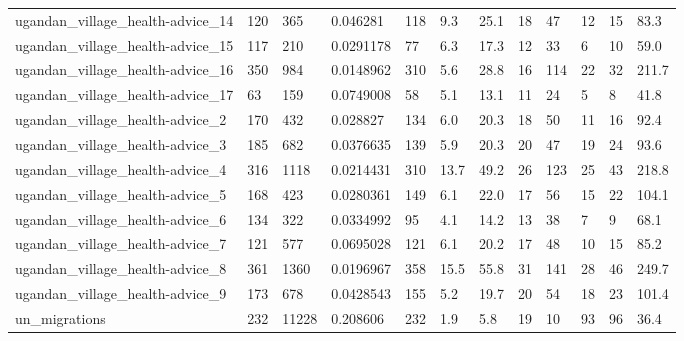\begin{longtable}{llllllllllll}
 ugandan\_village\_health-advice\_14                   & 120        & 365       & 0.046281    & 118   & 9.3    & 25.1   & 18    & 47     & 12     & 15     & 83.3    \\
 ugandan\_village\_health-advice\_15                   & 117        & 210       & 0.0291178   & 77    & 6.3    & 17.3   & 12    & 33     & 6      & 10     & 59.0    \\
 ugandan\_village\_health-advice\_16                   & 350        & 984       & 0.0148962   & 310   & 5.6    & 28.8   & 16    & 114    & 22     & 32     & 211.7   \\
 ugandan\_village\_health-advice\_17                   & 63         & 159       & 0.0749008   & 58    & 5.1    & 13.1   & 11    & 24     & 5      & 8      & 41.8    \\
 ugandan\_village\_health-advice\_2                    & 170        & 432       & 0.028827    & 134   & 6.0    & 20.3   & 18    & 50     & 11     & 16     & 92.4    \\
 ugandan\_village\_health-advice\_3                    & 185        & 682       & 0.0376635   & 139   & 5.9    & 20.3   & 20    & 47     & 19     & 24     & 93.6    \\
 ugandan\_village\_health-advice\_4                    & 316        & 1118      & 0.0214431   & 310   & 13.7   & 49.2   & 26    & 123    & 25     & 43     & 218.8   \\
 ugandan\_village\_health-advice\_5                    & 168        & 423       & 0.0280361   & 149   & 6.1    & 22.0   & 17    & 56     & 15     & 22     & 104.1   \\
 ugandan\_village\_health-advice\_6                    & 134        & 322       & 0.0334992   & 95    & 4.1    & 14.2   & 13    & 38     & 7      & 9      & 68.1    \\
 ugandan\_village\_health-advice\_7                    & 121        & 577       & 0.0695028   & 121   & 6.1    & 20.2   & 17    & 48     & 10     & 15     & 85.2    \\
 ugandan\_village\_health-advice\_8                    & 361        & 1360      & 0.0196967   & 358   & 15.5   & 55.8   & 31    & 141    & 28     & 46     & 249.7   \\
 ugandan\_village\_health-advice\_9                    & 173        & 678       & 0.0428543   & 155   & 5.2    & 19.7   & 20    & 54     & 18     & 23     & 101.4   \\
 un\_migrations                                      & 232        & 11228     & 0.208606    & 232   & 1.9    & 5.8    & 19    & 10     & 93     & 96     & 36.4    \\

\end{longtable}
